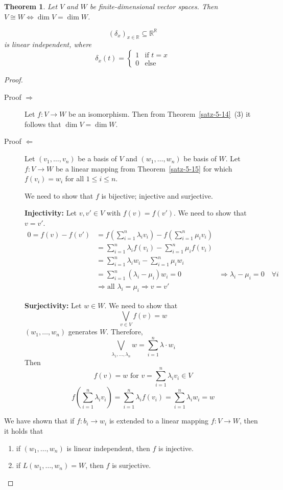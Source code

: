 \documentclass[a4paper,landscape,twocolumn]{article}
\newtheorem{theorem}{Theorem}
\begin{document}
\begin{theorem}
  \label{satz-5-16}
  Let $V$ and $W$ be finite-dimensional vector spaces.
  Then $V \cong W \Leftrightarrow \dim{V} = \dim{W}$.

  \[ \left(\delta_{x}\right)_{x \in \mathbb R} \subseteq \mathbb R^{\mathbb R} \]
  is linear independent, where
  \[
    \delta_x(t) = \begin{cases}
      1 & \text{if } t = x \\
      0 & \text{else}
    \end{cases}
  \]
\end{theorem}
\begin{proof}
  \begin{description}
    \item[Proof $\Rightarrow$]
      Let $f: V \rightarrow W$ be an isomorphism. Then from Theorem~\ref{satz-5-14}~(3)
      it follows that $\dim{V} = \dim{W}$.
    \item[Proof $\Leftarrow$]
      Let $(v_1, \dots, v_n)$ be a basis of $V$ and $(w_1, \dots, w_n)$ be basis of $W$.
      Let $f: V \rightarrow W$ be a linear mapping from Theorem~\ref{satz-5-15}
      for which $f(v_i) = w_i$ for all $1 \leq i \leq n$.

      We need to show that $f$ is bijective; injective and surjective.

      \textbf{Injectivity:} Let $v,v' \in V$ with $f(v) = f(v')$. We need to show that $v = v'$.
      \begin{align*}
        0 = f(v) - f(v')
          &= f\left(\sum_{i=1}^n \lambda_i v_i\right) - f\left(\sum_{i=1}^n \mu_i v_i\right) \\
          &= \sum_{i=1}^n \lambda_i f(v_i) - \sum_{i=1}^n \mu_i f(v_i) \\
          &= \sum_{i=1}^n \lambda_i w_i - \sum_{i=1}^n \mu_i w_i \\
          &= \sum_{i=1}^n (\lambda_i - \mu_i) w_i = 0
          &\Rightarrow \lambda_i - \mu_i = 0 \quad\forall i \\
          &\Rightarrow \text{all } \lambda_i = \mu_i \Rightarrow v = v'
      \end{align*}

      \textbf{Surjectivity:} Let $w \in W$. We need to show that
      \[ \bigvee_{v \in V} f(v) = w \]
      $(w_1, \dots, w_n)$ generates $W$. Therefore,
      \[ \bigvee_{\lambda_1, \dots, \lambda_n} w = \sum_{i=1}^n \lambda \cdot w_i \]
      Then
      \[ f(v) = w \text{ for } v = \sum_{i=1}^n \lambda_i v_i \in V \]
      \[ f\left(\sum_{i=1}^n \lambda_i v_i\right) = \sum_{i=1}^n \lambda_i f(v_i) = \sum_{i=1}^n \lambda_i w_i = w \]
  \end{description}

  We have shown that if $f: b_i \rightarrow w_i$ is extended to a linear mapping $f: V \rightarrow W$,
  then it holds that
  \begin{enumerate}
    \item if $(w_1, \dots, w_n)$ is linear independent, then $f$ is injective.
    \item if $L(w_1, \dots, w_n) = W$, then $f$ is surjective.
  \end{enumerate}
\end{proof}
\end{document}
